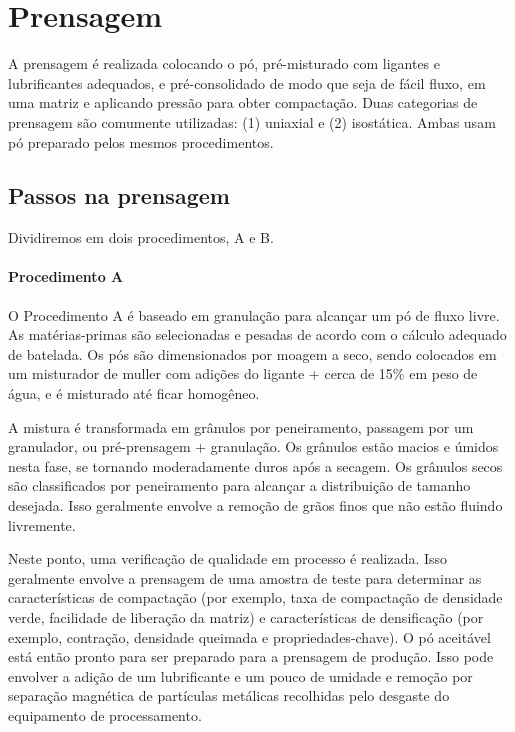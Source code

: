 
\section*{Prensagem}

A prensagem é realizada colocando o pó, pré-misturado com ligantes e lubrificantes adequados, e pré-consolidado de modo que seja de fácil fluxo, em uma matriz e aplicando pressão para obter compactação. Duas categorias de prensagem são comumente utilizadas: (1) uniaxial e (2) isostática. Ambas usam pó preparado pelos mesmos procedimentos.

\subsection*{Passos na prensagem}

Dividiremos em dois procedimentos, A e B.

\paragraph*{Procedimento A}

O Procedimento A é baseado em granulação para alcançar um pó de fluxo livre. As matérias-primas são selecionadas e pesadas de acordo com o cálculo adequado de batelada. Os pós são dimensionados por moagem a seco, sendo colocados em um misturador de muller com adições do ligante + cerca de 15\% em peso de água, e é misturado até ficar homogêneo.

A mistura é transformada em grânulos por peneiramento, passagem por um granulador, ou pré-prensagem + granulação. Os grânulos estão macios e úmidos nesta fase, se tornando moderadamente duros após a secagem. Os grânulos secos são classificados por peneiramento para alcançar a distribuição de tamanho desejada. Isso geralmente envolve a remoção de grãos finos que não estão fluindo livremente.

Neste ponto, uma verificação de qualidade em processo é realizada. Isso geralmente envolve a prensagem de uma amostra de teste para determinar as características de compactação (por exemplo, taxa de compactação de densidade verde, facilidade de liberação da matriz) e características de densificação (por exemplo, contração, densidade queimada e propriedades-chave). O pó aceitável está então pronto para ser preparado para a prensagem de produção. Isso pode envolver a adição de um lubrificante e um pouco de umidade e remoção por separação magnética de partículas metálicas recolhidas pelo desgaste do equipamento de processamento.

